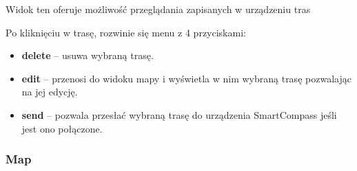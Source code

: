 Widok ten oferuje możliwość przeglądania zapisanych w urządzeniu tras

Po kliknięciu w trasę, rozwinie się menu z 4 przyciskami:
\begin{itemize}
    \item \textbf{delete} – usuwa wybraną trasę.
    \item \textbf{edit} – przenosi do widoku mapy i wyświetla w nim wybraną trasę pozwalając na jej edycję.
    \item \textbf{send} – pozwala przesłać wybraną trasę do urządzenia SmartCompass jeśli jest ono połączone.
\end{itemize}

\subsubsection{Map}
